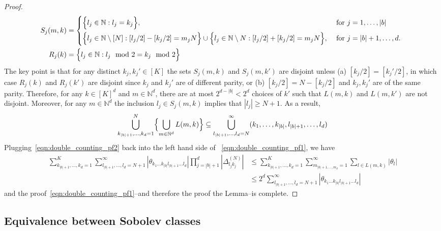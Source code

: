 \documentclass{article}
\newcommand{\abs}[1]{\left \lvert #1 \right \rvert}
\newcommand{\1}{\mathbf{1}}
\theoremstyle{alden}
\theoremstyle{aldenthm}
\theoremstyle{definition}
\theoremstyle{remark}
\begin{document}
\begin{proof}
	\begin{align*}
	S_j(m,k) & = 
	\begin{cases*}
	\Bigl\{l_j \in \mathbb{N}: l_j = k_j\Bigr\}, & ~\textrm{for $j = 1,\ldots,\abs{b}$} \\
	\Bigl\{l_j \in \mathbb{N} \setminus [N]: [l_j/2] - [k_j/2] = m_j N \Bigr\} \cup \Bigl\{l_j \in \mathbb{N} \setminus{N}: [l_j/2] + [k_j/2] = m_j N \Bigr\}, & ~\textrm{for $j = \abs{b} + 1,\ldots,d$}.
	\end{cases*} \\
	R_j(k) & = \Bigl\{l_j \in \mathbb{N}: l_j \mod 2 = k_j \mod 2\Bigr\}
	\end{align*}
	The key point is that for any distinct $k_j,k_j' \in [K]$ the sets $S_j(m,k)$ and $S_j(m,k')$ are disjoint unless (a) $[k_j/2] = [k_j'/2]$, in which case $R_j(k)$ and $R_j(k')$ are disjoint since $k_j$ and $k_j'$ are of different parity, or (b) $[k_j/2] = N - [k_j/2]$ and $k_j,k_j'$ are of the same parity. Therefore, for any $k \in [K]^d$ and $m \in \mathbb{N}^d$, there are at most $2^{d - \abs{b}} < 2^d$ choices of $k'$ such that $L(m,k)$ and $L(m,k')$ are not disjoint. Moreover, for any $m \in \mathbb{N}^d$ the inclusion $l_j \in S_j(m,k)$ implies that $\abs{l_j} \geq N + 1$. As a result,
	\begin{equation*}
	\bigcup_{k_{\abs{b} + 1},\ldots,k_d = 1}^{N}\Bigl\{\bigcup_{m \in \mathbb{N}^d} L(m,k)\Bigr\} \subseteq \bigcup_{l_{\abs{b} + 1},\ldots, l_{d} = N}^{\infty} (k_1,\ldots,k_{\abs{b}},l_{\abs{b} + 1},\ldots,l_d)
	\end{equation*} Plugging~\eqref{eqn:double_counting_pf2} back into the left hand side of~ \eqref{eqn:double_counting_pf1}, we have
	\begin{align*}
	\sum_{k_{\abs{b} + 1},\ldots,k_{d} = 1}^{K} \sum_{l_{\abs{b} + 1}, \ldots, l_d = N + 1}^{\infty} \abs{\theta_{k_1\ldots k_{\abs{b}} l_{\abs{b} + 1} \ldots l_d}} \prod_{j = \abs{b} + 1}^{d} \abs{\Delta_{l_jk_j}^{(N)}} & \leq \sum_{k_{\abs{b} + 1},\ldots,k_{d} = 1}^{K} \sum_{m_{\abs{b} + 1,\ldots, m_d} = 1}^{\infty} \sum_{l \in L(m,k)} \abs{\theta_l} \\
	& \leq 2^d \sum_{l_{\abs{b} + 1},\ldots,l_{d} = N + 1}^{\infty} \abs{\theta_{k_1\ldots k_{\abs{b}} l_{\abs{b} + 1} \ldots l_d}}
	\end{align*}
	and the proof~\eqref{eqn:double_counting_pf1}--and therefore the proof the Lemma--is complete.
\end{proof}

\subsection{Equivalence between Sobolev classes}
\label{subsec:sobolev_class_equivalence}
\end{document}
